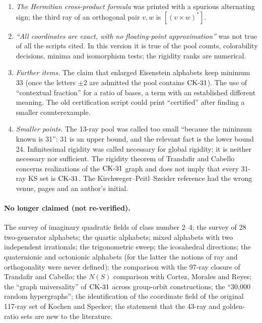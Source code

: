 \begin{enumerate}[label=C\arabic*.,leftmargin=2.6em]
orthogonal pairs in total; version~9 said its 76 auxiliary rays ``add'' 522.  The integer pool
has 6 minimum sets in one symmetry class, not 162 in six.
\item \emph{The Hermitian cross-product formula} was printed with a spurious alternating sign;
the third ray of an orthogonal pair $v,w$ is $[(v\times w)^{*}]$.
\item \emph{``All coordinates are exact, with no floating-point approximation''} was not true of
all the scripts cited.  In this version it is true of the pool counts, colorability decisions,
minima and isomorphism tests; the rigidity ranks are numerical.
\item \emph{Further items.}  The claim that enlarged Eisenstein alphabets keep minimum 33 (once
the letters $\pm2$ are admitted the pool contains $\mathrm{CK}\text{-}31$).  The use of ``contextual fraction'' for
a ratio of bases, a term with an established different meaning.  The old certification script
could print ``certified'' after finding a smaller counterexample.\item \emph{Smaller points.}  The 13-ray pool was called too small ``because the minimum known is
31'': 31 is an upper bound, and the relevant fact is the lower bound 24.  Infinitesimal rigidity
was called necessary for global rigidity; it is neither necessary nor sufficient.  The rigidity
theorem of Trandafir and Cabello concerns realizations of the $\mathrm{CK}\text{-}31$ graph and does not imply that
every 31-ray KS set is $\mathrm{CK}\text{-}31$.  The Kirchweger--Peitl--Szeider reference had the wrong venue,
pages and an author's initial.
\end{enumerate}

\paragraph{No longer claimed (not re-verified).}
The survey of imaginary quadratic fields of class number 2--4; the survey of 28 two-generator
alphabets; the quartic alphabets; mixed alphabets with two independent irrationals; the
trigonometric sweep; the icosahedral directions; the quaternionic and octonionic alphabets (for
the latter the notions of ray and orthogonality were never defined); the comparison with the
97-ray closure of Trandafir and Cabello; the $N(S)$ comparison with Cortez, Morales and Reyes;
the ``graph universality'' of $\mathrm{CK}\text{-}31$ across group-orbit constructions; the ``30{,}000 random
hypergraphs''; the identification of the coordinate field of the original 117-ray set of Kochen
and Specker; the statement that the 43-ray and golden-ratio sets are new to the literature.
